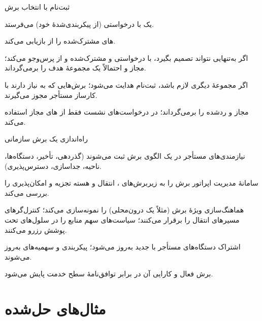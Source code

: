 \documentclass[11pt,a4paper]{article}
\begin{document}
\begin{procedurebox}{ثبت‌نام با انتخاب برش}\label{proc:sel}
\begin{steps}
  \item {} یک  با  درخواستی (از  پیکربندی‌شدهٔ خود) می‌فرستد.
  \item {} های مشترک‌شده را از  بازیابی می‌کند.
  \item اگر به‌تنهایی نتواند تصمیم بگیرد،  با  درخواستی و مشترک‌شده و   از  پرس‌وجو
        می‌کند؛   مجاز و احتمالاً یک مجموعهٔ  هدف را برمی‌گرداند.
  \item اگر مجموعهٔ  دیگری لازم باشد، ثبت‌نام هدایت می‌شود؛ برش‌هایی که به  نیاز دارند با کارساز  مستأجر
        مجوز می‌گیرند.
  \item {}  مجاز و ردشده را برمی‌گرداند؛  در درخواست‌های نشست  فقط از
        های مجاز استفاده می‌کند.
\end{steps}
\end{procedurebox}

\begin{procedurebox}{راه‌اندازی یک برش سازمانی}\label{proc:commission}
\begin{steps}
  \item نیازمندی‌های مستأجر در یک الگوی برش ثبت می‌شوند (گذردهی، تأخیر، دستگاه‌ها، ناحیه، جداسازی، دسترس‌پذیری).
  \item سامانهٔ مدیریت اپراتور برش را به زیربرش‌های ، انتقال و هسته تجزیه و امکان‌پذیری را بررسی می‌کند.
  \item هماهنگ‌سازی   ویژهٔ برش (مثلاً یک  درون‌محلی) را نمونه‌سازی می‌کند؛ کنترل‌گرهای 
        مسیرهای انتقال را برقرار می‌کنند؛ سیاست‌های  سهم منابع را در سلول‌های تحت پوشش رزرو می‌کنند.
  \item اشتراک دستگاه‌های مستأجر با  جدید به‌روز می‌شود؛ پیکربندی  و سهمیه‌های  به‌روز می‌شوند.
  \item برش فعال و کارایی آن در برابر توافق‌نامهٔ سطح خدمت پایش می‌شود.
\end{steps}
\end{procedurebox}

\section{مثال‌های حل‌شده}
\end{document}
